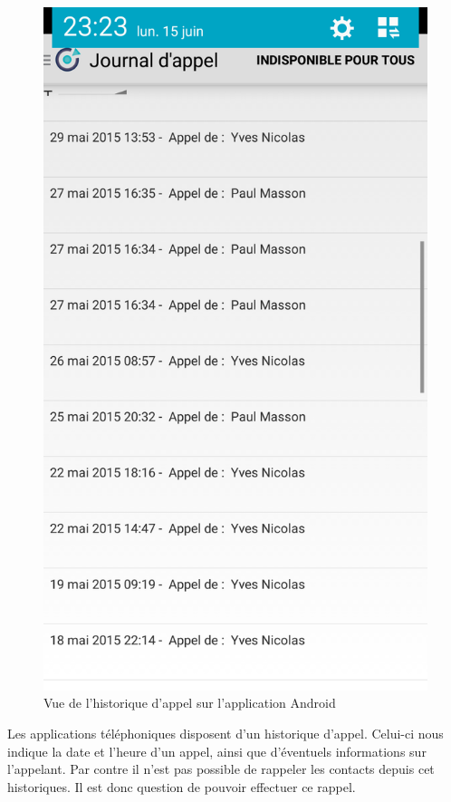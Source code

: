 \begin{figure}[!h]
	\centering
	\includegraphics[scale=0.1]{img/historique.png}
	\caption{\label{historique} {Vue de l'historique d'appel sur l'application Android}}
\end{figure}

Les applications téléphoniques disposent d'un historique d'appel. Celui-ci nous indique la date et l'heure d'un appel, ainsi que d'éventuels informations sur l'appelant. Par contre il n'est pas possible de rappeler les contacts depuis cet historiques. Il est donc question de pouvoir effectuer ce rappel.

